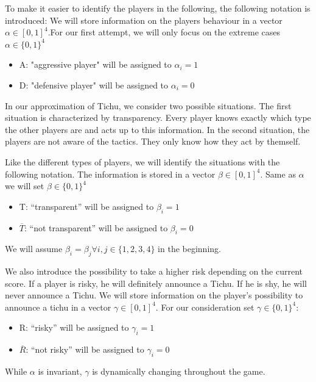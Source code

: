 To make it easier to identify the players in the following, the following notation is introduced:
We will store information on the players behaviour in a vector $\alpha \in [0,1]^4$.For our first attempt, we will only focus on the extreme cases $\alpha \in \{0,1\}^4$
\\ 
\begin{itemize}
\item A: "aggressive player" will be assigned to $\alpha_i = 1$
\item D: "defensive player" will be assigned to $\alpha_i = 0$ \\
\end{itemize} 
In our approximation of Tichu, we consider two possible situations. 
The first situation is characterized by transparency. Every player knows exactly which type the other players are and acts up to this information.
In the second situation, the players are not aware of the tactics. They only know how they act by themself.

Like the different types of players, we will identify the situations with the following notation. The information is stored in a vector $\beta \in [0,1]^4$. Same as $\alpha$ we will set $\beta \in \{0,1\}^4$\\ 
\begin{itemize}
\item T: “transparent” will be assigned to $\beta_i = 1$
\item $\overline{T}$: “not transparent” will be assigned to $\beta_i = 0$ \\
\end{itemize}

We will assume  $\beta_i = \beta_j \forall i, j\in \{1,2,3,4\}$ in the beginning. 

We also introduce the possibility to take a higher risk depending on the current score. If a player is risky, he will definitely announce a Tichu. If he is shy, he will never announce a Tichu. We will store information on the player's possibility to announce a tichu in a vector $\gamma \in [0,1]^4$. For our consideration set  $\gamma \in \{0,1\}^4$: \\
\begin{itemize}
\item R: “risky” will be assigned to $\gamma_i = 1$
\item $\overline{R}$: “not risky” will be assigned to $\gamma_i = 0$ \\
\end{itemize}
While $\alpha$ is invariant, $\gamma$ is dynamically changing throughout the game. 

